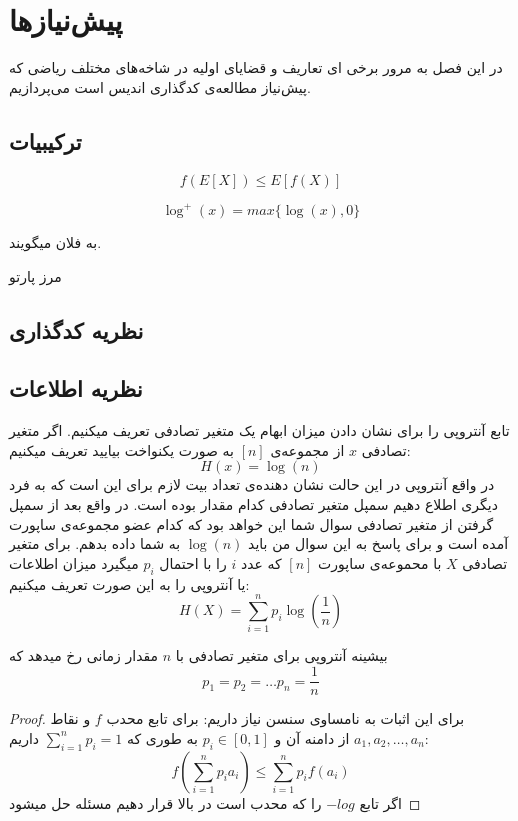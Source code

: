 \chapter{پیش‌نیازها}
\label{chapter:preliminaries}
در این فصل به مرور برخی ای تعاریف و قضایای اولیه در شاخه‌های مختلف ریاضی که پیش‌نیاز مطالعه‌ی کدگذاری اندیس است می‌پردازیم.

\section{ترکیبیات}

\begin{theorem}
\label{Jensen}
\end{theorem}
$$f(E[X]) \leq E[f(X)]$$

$$\log^{+}(x) = max\{\log(x), 0\}$$
\begin{definition}
	\label{def:Pareto}
	به فلان میگویند.
	
	مرز پارتو
	\label{def:Pareto-boundary}
\end{definition}
\section{نظریه کدگذاری}
\begin{definition}[
	کد
	\lr{mds}
	]
	\label{def:mds}
\end{definition}
\section{
    ‌نظریه اطلاعات
}

تابع آنتروپی را برای نشان دادن میزان ابهام یک متغیر تصادفی تعریف میکنیم. اگر متغیر تصادفی
$x$
از مجموعه‌ی
$[n]$
به صورت یکنواخت بیایید تعریف میکنیم:
$$H(x) = \log(n)$$
در واقع آنتروپی در این حالت نشان دهنده‌ی تعداد بیت لازم برای این است که به فرد دیگری اطلاع دهیم سمپل متغیر تصادفی کدام مقدار بوده است. در واقع بعد از سمپل گرفتن از متغیر تصادفی سوال شما این خواهد بود که کدام عضو مجموعه‌ی ساپورت آمده است و برای پاسخ به این سوال من باید
$\log(n)$
به شما داده بدهم.
برای متغیر تصادفی
$X$
با محموعه‌ی ساپورت
$[n]$
که عدد
$i$
را با احتمال
$p_i$
میگیرد میزان اطلاعات یا آنتروپی را به این صورت تعریف میکنیم:
$$H(X) = \sum_{i = 1}^{n} p_i \log(\frac{1}{n})$$

\begin{theorem}
بیشینه آنتروپی برای متغیر تصادفی با
$n$
مقدار زمانی رخ میدهد که
$$p_1 = p_2 = \dots p_n = \frac{1}{n}$$
\end{theorem}
\begin{proof}
برای این اثبات به نامساوی سنسن نیاز داریم: برای تابع محدب
$f$
و نقاط
$a_1, a_2, \dots, a_n$
از دامنه آن و
$p_i \in [0, 1]$
به طوری که
$\sum_{i = 1}^{n} p_i = 1$
داریم:
$$f(\sum_{i = 1}^{n} p_i a_i) \leq \sum_{i = 1}^{n} p_i f(a_i)$$
اگر تابع
$- log$
را که محدب است در بالا قرار دهیم مسئله حل میشود
\end{proof}

